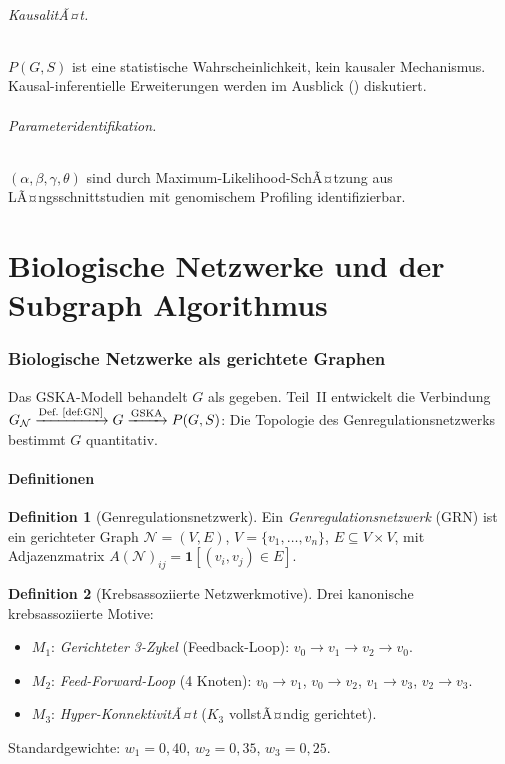 ﻿\documentclass[12pt, a4paper]{article}
\theoremstyle{definition}
\newtheorem{definition}{Definition}[section]
\theoremstyle{remark}
\newcommand{\calN}{\mathcal{N}}
\newcommand{\GN}{G_{\calN}}
\begin{document}
\paragraph{KausalitÃ¤t.}
$P(G,S)$ ist eine statistische Wahrscheinlichkeit, kein kausaler Mechanismus.
Kausal-inferentielle Erweiterungen werden im Ausblick ()
diskutiert.

\paragraph{Parameteridentifikation.}
$(\alpha, \beta, \gamma, \theta)$ sind durch Maximum-Likelihood-SchÃ¤tzung aus
LÃ¤ngsschnittstudien mit genomischem Profiling identifizierbar.





\part{Biologische Netzwerke und der Subgraph Algorithmus}
\label{part:bio}


\section{Biologische Netzwerke als gerichtete Graphen}
\label{sec:netzwerke}


Das GSKA-Modell behandelt $G$ als gegeben. Teil~II entwickelt die Verbindung
$\GN \xrightarrow{\text{Def.~\ref{def:GN}}} G \xrightarrow{\text{GSKA}} P(G,S)$:
Die Topologie des Genregulationsnetzwerks bestimmt $G$ quantitativ.

\subsection{Definitionen}

\begin{definition}[Genregulationsnetzwerk]
\label{def:grn}
Ein \emph{Genregulationsnetzwerk} (GRN) ist ein gerichteter Graph
$\calN = (V, E)$, $V = \{v_1, \ldots, v_n\}$, $E \subseteq V \times V$,
mit Adjazenzmatrix $A(\calN)_{ij} = \mathbf{1}[(v_i,v_j)\in E]$.
\end{definition}

\begin{definition}[Krebsassoziierte Netzwerkmotive]
\label{def:motiv}
Drei kanonische krebsassoziierte Motive:
\begin{itemize}
  \item $M_1$: \emph{Gerichteter 3-Zykel} (Feedback-Loop):
    $v_0\to v_1\to v_2\to v_0$.
  \item $M_2$: \emph{Feed-Forward-Loop} (4 Knoten):
    $v_0\to v_1$, $v_0\to v_2$, $v_1\to v_3$, $v_2\to v_3$.
  \item $M_3$: \emph{Hyper-KonnektivitÃ¤t} ($K_3$ vollstÃ¤ndig gerichtet).
\end{itemize}
Standardgewichte: $w_1 = 0{,}40$, $w_2 = 0{,}35$, $w_3 = 0{,}25$.
\end{definition}
\end{document}
